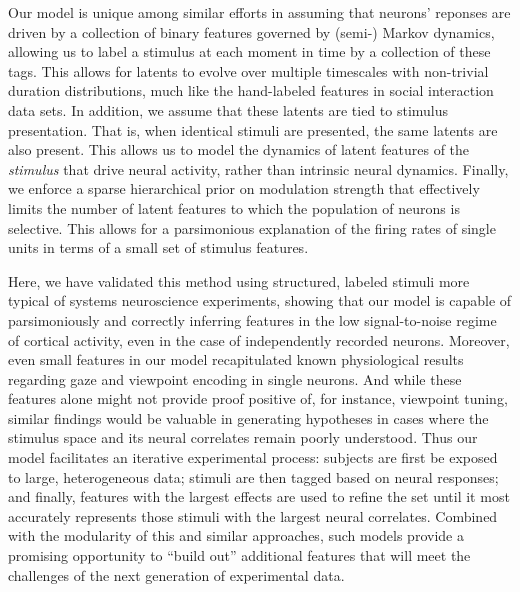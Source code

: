 \documentclass{nature}
\begin{document}
Our model is unique among similar efforts in assuming that neurons' reponses are driven by a collection of binary features governed by (semi-) Markov dynamics, allowing us to label a stimulus at each moment in time by a collection of these tags. This allows for latents to evolve over multiple timescales with non-trivial duration distributions, much like the hand-labeled features in social interaction data sets. In addition, we assume that these latents are tied to stimulus presentation. That is, when identical stimuli are presented, the same latents are also present. This allows us to model the dynamics of latent features of the \emph{stimulus} that drive neural activity, rather than intrinsic neural dynamics. Finally, we enforce a sparse hierarchical prior on modulation strength that effectively limits the number of latent features to which the population of neurons is selective. This allows for a parsimonious explanation of the firing rates of single units in terms of a small set of stimulus features.

Here, we have validated this method using structured, labeled stimuli more typical of systems neuroscience experiments, showing that our model is capable of parsimoniously and correctly inferring features in the low signal-to-noise regime of cortical activity, even in the case of independently recorded neurons. Moreover, even small features in our model recapitulated known physiological results regarding gaze and viewpoint encoding in single neurons. And while these features alone might not provide proof positive of, for instance, viewpoint tuning, similar findings would be valuable in generating hypotheses in cases where the stimulus space and its neural correlates remain poorly understood. Thus our model facilitates an iterative experimental process: subjects are first be exposed to large, heterogeneous data; stimuli are then tagged based on neural responses; and finally, features with the largest effects are used to refine the set until it most accurately represents those stimuli with the largest neural correlates. Combined with the modularity of this and similar approaches, such models provide a promising opportunity to ``build out'' additional features that will meet the challenges of the next generation of experimental data.
\end{document}

